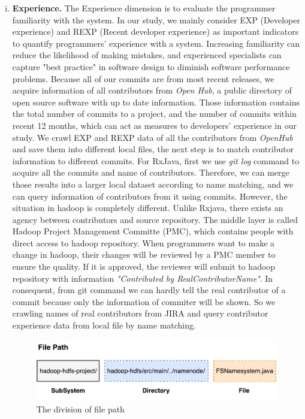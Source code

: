 \begin{enumerate}[(i)]
	\item \noindent
	\textbf{Experience.}
	The Experience dimension is to evaluate the programmer familiarity with the system. In our study, we mainly consider EXP (Developer experience) and REXP (Recent developer experience) as important indicators to quantify programmers' experience with a system. Increasing familiarity can reduce the likelihood of making mistakes\cite{mockus2000predicting}, and experienced specialists can capture "best practice" in software design to diminish software performance problems\cite{smith2003more}. Because all of our commits are from most recent releases, we acquire information of all contributors from  \textit{Open Hub}, a public directory of open source software with up to date information. Those information contains the total number of commits to a project, and the number of commits within recent 12 months, which can act as measures to developers' experience in our study. We crawl EXP and REXP data of all the contributors from \textit{OpenHub} and save them into different local files, the next step is to match contributor information to different commits. For RxJava, first we use \textit{git log} command to acquire all the commits and name of contributors. Therefore, we can merge those results into a larger local dataset according to name matching, and we can query information of contributors from it using commits. However, the situation in hadoop is completely different. Unlike Rxjava, there exists an agency between contributors and source repository. The middle layer is called Hadoop Project Management Committe (PMC), which contains people with direct access to hadoop repository. When programmers want to make a change in hadoop, their changes will be reviewed by a PMC member to ensure the quality. If it is approved, the reviewer will submit to hadoop repository with information \textit{"Contributed by RealContributorName"}. In consequent, from git command we can hardly tell the real contributor of a commit because only the information of commiter will be shown. So we crawling names of real contributors from JIRA and query contributor experience data from local file by name matching. 
	
	
	\begin{figure}
		\centering
		\includegraphics[width=\columnwidth]{Diffusion.pdf}
		\centering \caption{The division of file path}
		\label{fig:diffusion}
	\end{figure}
\end{enumerate}



